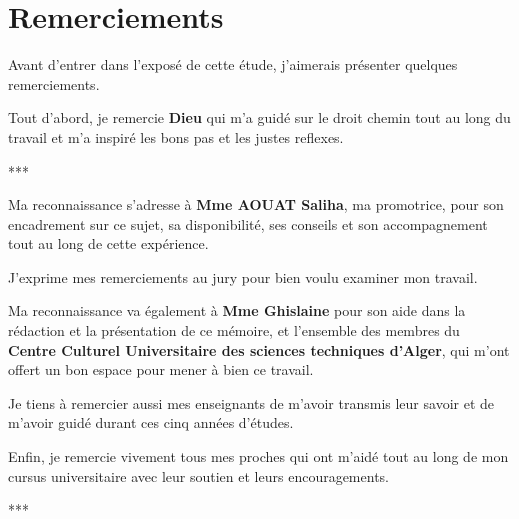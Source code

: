\begin{titlepage}
\itshape

\chapter*{Remerciements}

Avant d'entrer dans l'exposé de cette étude, j'aimerais présenter quelques remerciements.

Tout d'abord, je remercie \textbf{Dieu} qui m'a guidé sur le droit chemin tout
au long du travail et m'a inspiré les bons pas et les justes reflexes.
\begin{center}
***
\end{center}
Ma reconnaissance s'adresse à \textbf{Mme AOUAT Saliha}, ma promotrice,
pour son encadrement sur ce sujet, sa disponibilité, ses conseils et son accompagnement
tout au long de cette expérience.

J'exprime mes remerciements au jury pour bien voulu examiner mon travail.

Ma reconnaissance va également à \textbf{Mme Ghislaine} pour son aide dans
la rédaction et la présentation de ce mémoire, et l'ensemble des membres du
\textbf{Centre Culturel Universitaire des sciences techniques d'Alger}, qui
m'ont offert un bon espace pour mener à bien ce travail.

Je tiens à remercier aussi mes enseignants de m'avoir transmis leur savoir et
de m'avoir guidé durant ces cinq années d'études.

Enfin, je remercie vivement tous mes proches qui ont m'aidé tout au long de mon
cursus universitaire avec leur soutien et leurs encouragements.
\begin{center}
***
\end{center}
\end{titlepage}

